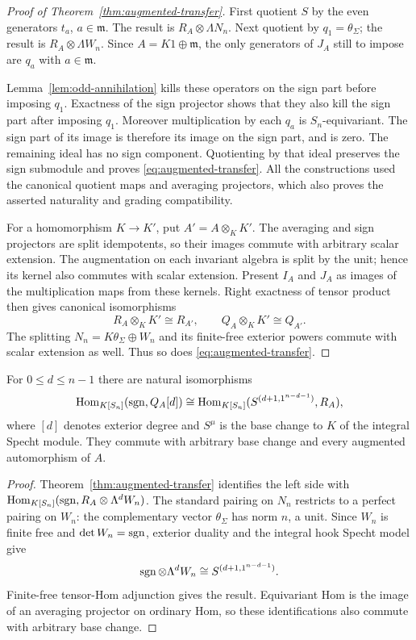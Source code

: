 \begin{proof}[Proof of Theorem~\ref{thm:augmented-transfer}]
First quotient $S$ by the even generators $t_a$,
$a\in\mathfrak m$.  The result is
$R_A\otimes\Lambda N_n$.
Next quotient by $q_1=\theta_\Sigma$; the result is
$R_A\otimes\Lambda W_n$.
Since $A=K1\oplus\mathfrak m$, the only generators
of $J_A$ still to impose are $q_a$ with
$a\in\mathfrak m$.

Lemma~\ref{lem:odd-annihilation} kills these operators
on the sign part before imposing $q_1$.  Exactness of
the sign projector shows that they also kill the sign
part after imposing $q_1$.
Moreover multiplication by each $q_a$ is
$S_n$-equivariant.  The sign part of its image is
therefore its image on the sign part, and is zero.
The remaining ideal has no sign component.
Quotienting by that ideal preserves the sign submodule
and proves \eqref{eq:augmented-transfer}.
All the constructions used the canonical quotient
maps and averaging projectors, which also proves
the asserted naturality and grading compatibility.

For a homomorphism $K\to K'$, put $A'=A\otimes_KK'$.
The averaging and sign projectors are split idempotents, so their
images commute with arbitrary scalar extension.  The augmentation
on each invariant algebra is split by the unit; hence its kernel
also commutes with scalar extension.  Present $I_A$ and $J_A$ as
images of the multiplication maps from these kernels.  Right
exactness of tensor product then gives canonical isomorphisms
\[
 R_A\otimes_KK'\cong R_{A'},\qquad
 Q_A\otimes_KK'\cong Q_{A'}.
\]
The splitting $N_n=K\theta_\Sigma\oplus W_n$ and its finite-free
exterior powers commute with scalar extension as well.  Thus so
does \eqref{eq:augmented-transfer}.
\end{proof}

\begin{corollary}
\label{cor:pointed-hooks}
For $0\leq d\leq n-1$ there are natural isomorphisms
\[
 \operatorname{Hom}_{K[S_n]}(\operatorname{sgn},Q_A[d])
       \cong
 \operatorname{Hom}_{K[S_n]}(S^{(d+1,1^{n-d-1})},R_A),
\]
where $[d]$ denotes exterior degree and $S^\mu$ is the base
change to $K$ of the integral Specht module.
They commute with arbitrary base change and every augmented
automorphism of $A$.
\end{corollary}

\begin{proof}
Theorem~\ref{thm:augmented-transfer} identifies the
left side with
$\operatorname{Hom}_{K[S_n]}(\operatorname{sgn},R_A\otimes\Lambda^dW_n)$.
The standard pairing on $N_n$ restricts to a perfect pairing on
$W_n$: the complementary vector $\theta_\Sigma$ has norm $n$,
a unit.  Since $W_n$ is finite free and $\det W_n=\operatorname{sgn}$,
exterior duality and the integral hook Specht model
\cite[Section~5.5(b)]{DanzHofmann} give
\[
 \operatorname{sgn}\otimes\Lambda^dW_n
       \cong S^{(d+1,1^{n-d-1})}.
\]
Finite-free tensor-Hom adjunction gives the result.  Equivariant
Hom is the image of an averaging projector on ordinary Hom, so
these identifications also commute with arbitrary base change.
\end{proof}

